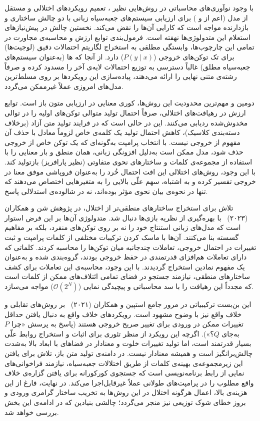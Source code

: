 با وجود نوآوری‌های محاسباتی در روش‌هایی نظیر ، تعمیم رویکردهای اختلالی و مستقل از مدل (اعم از  و ) برای ارزیابی سیستم‌های جعبه‌سیاه زبانی با دو چالش ساختاری و بازدارنده مواجه است که کارایی آن‌ها را نقض می‌کند. نخستین چالش در پیش‌نیازهای استعلام این متدولوژی‌ها نهفته است. فرمول‌بندی توابع ارزش و محاسبه‌ی مجاورت در تمامی این چارچوب‌ها، وابستگی مطلقی به استخراج لگاریتم احتمالات دقیق (لوجیت‌ها) برای تک توکن‌های خروجی ($P(y \mid x)$) دارد. از آنجا که ها (به‌عنوان سیستم‌های جعبه‌سیاه مطلق) غالباً دسترسی به توزیع احتمالات لایه‌ی آخر را مسدود کرده و صرفاً رشته‌ی متنی نهایی را ارائه می‌دهند، پیاده‌سازی این رویکردها بر روی مسلط‌ترین مدل‌های امروزی عملاً غیرممکن می‌گردد. 

دومین و مهم‌ترین محدودیت این روش‌ها، کوری معنایی در ارزیابی متون باز است. توابع ارزش در رهیافت‌های اختلالی، صرفاً احتمال تولید متوالی توکن‌های اولیه را در توالی مخدوش‌شده ردیابی می‌کنند. این در حالی است که در فرایند تولید متن آزاد (برخلاف دسته‌بندی کلاسیک)، کاهش احتمال تولید یک کلمه‌ی خاص لزوماً معادل با حذف آن مفهوم از خروجی نیست. با انتخاب پرامپت به‌گونه‌ای که یک توکن خاص از خروجی حذف شود، مدل ممکن است به‌دلیل افزونگی زبانی، همان منطق و بار معنایی را با استفاده از مجموعه‌ی کلمات و ساختارهای نحوی متفاوتی (نظیر پارافریز) بازتولید کند. با این وجود، روش‌های اختلالی این افت احتمال خُرد را به‌عنوان فروپاشی موفق معنا در خروجی تفسیر کرده و به اشتباه، سهم علّی بالایی را به متغیرهایی اختصاص می‌دهند که تنها در نحوه‌ی بیان نحوی مؤثر بوده‌اند، نه در شالوده‌ی استدلالی پاسخ.

تلاش برای استخراج ساختارهای منطقی‌تر از اختلال، در پژوهش شن و همکاران (۲۰۲۳)~\cite{shen2023inferencelogic} با بهره‌گیری از نظریه بازی‌ها دنبال شد. متدولوژی آن‌ها بر این فرض استوار است که مدل‌های زبانی استنتاج خود را نه بر روی توکن‌های منفرد، بلکه بر مفاهیم گسسته بنا می‌کنند. آن‌ها با ماسک کردن ترکیبات مختلفی از کلمات پرامپت و ثبت تغییرات در احتمال خروجی، تعاملات چندجانبه میان توکن‌ها را محاسبه کردند. کلماتی که دارای تعاملات هم‌افزای قدرتمندی در حفظ خروجی بودند، گروه‌بندی شده و به‌عنوان یک مفهوم نمادین استخراج گردیدند. با این وجود، محاسبه‌ی این تعاملات برای کشف ساختارهای منطقی، نیازمند جستجو در فضای تمامی ائتلاف‌های ممکن از کلمات است که مجدداً این رهیافت را با سد محاسباتی و پیچیدگی نمایی ($\mathcal{O}(2^N)$) مواجه می‌سازد.

این بن‌بست ترکیبیاتی در مرور جامع استپین و همکاران (۲۰۲۱)~\cite{stepin2021survey} بر روش‌های تقابلی و خلاف واقع نیز با وضوح مشهود است. رویکردهای خلاف واقع به دنبال یافتن حداقل تغییرات ممکن در ورودی برای تغییر صریح خروجی هستند (پاسخ به پرسش «چرا $P$ به‌جای $Q$؟»). اگرچه این رویکرد از منظر تئوری برای اثبات و استخراج روابط علّی بسیار قدرتمند است، اما تولید تغییرات خلوت و معنادار در فضاهای با ابعاد بالا به‌شدت چالش‌برانگیز است و همیشه معنادار نیست. در دامنه‌ی تولید متن باز، تلاش برای یافتن این زیرمجموعه‌ی بهینه‌ی کلمات از طریق اختلالات جعبه‌سیاه، نیازمند فراخوانی‌های نمایی از رابط برنامه‌نویسی است که جستجوی کورکورانه برای یافتن گزاره‌ی خلاف واقع مطلوب را در پرامپت‌های طولانی عملاً غیرقابل‌اجرا می‌کند. در نهایت، فارغ از این هزینه‌ی بالا، اعمال هرگونه اختلال در این روش‌ها به تخریب ساختار گرامری ورودی و بروز خطای شوک توزیعی نیز منجر می‌گردد؛ چالشی بنیادین که در ادامه‌ی این بخش بررسی خواهد شد.

